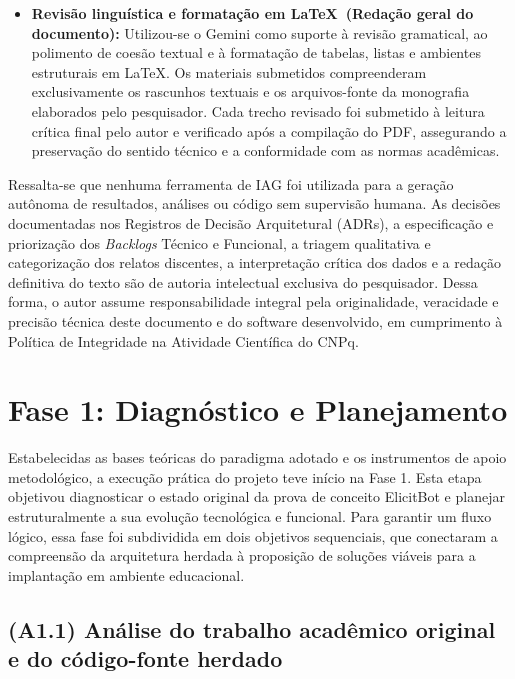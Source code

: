 \begin{itemize}
    \item \textbf{Revisão linguística e formatação em \LaTeX\ (Redação geral do documento):} Utilizou-se o Gemini como suporte à revisão gramatical, ao polimento de coesão textual e à formatação de tabelas, listas e ambientes estruturais em \LaTeX. Os materiais submetidos compreenderam exclusivamente os rascunhos textuais e os arquivos-fonte da monografia elaborados pelo pesquisador. Cada trecho revisado foi submetido à leitura crítica final pelo autor e verificado após a compilação do PDF, assegurando a preservação do sentido técnico e a conformidade com as normas acadêmicas.
\end{itemize}

Ressalta-se que nenhuma ferramenta de IAG foi utilizada para a geração autônoma de resultados, análises ou código sem supervisão humana. As decisões documentadas nos Registros de Decisão Arquitetural (ADRs), a especificação e priorização dos \textit{Backlogs} Técnico e Funcional, a triagem qualitativa e categorização dos relatos discentes, a interpretação crítica dos dados e a redação definitiva do texto são de autoria intelectual exclusiva do pesquisador. Dessa forma, o autor assume responsabilidade integral pela originalidade, veracidade e precisão técnica deste documento e do software desenvolvido, em cumprimento à Política de Integridade na Atividade Científica do CNPq.

\section{Fase 1: Diagnóstico e Planejamento}
\label{sec:fase1}

Estabelecidas as bases teóricas do paradigma adotado e os instrumentos de apoio metodológico, a execução prática do projeto teve início na Fase 1. Esta etapa objetivou diagnosticar o estado original da prova de conceito ElicitBot e planejar estruturalmente a sua evolução tecnológica e funcional. Para garantir um fluxo lógico, essa fase foi subdividida em dois objetivos sequenciais, que conectaram a compreensão da arquitetura herdada à proposição de soluções viáveis para a implantação em ambiente educacional.

\subsection{(A1.1) Análise do trabalho acadêmico original e do código-fonte herdado}

